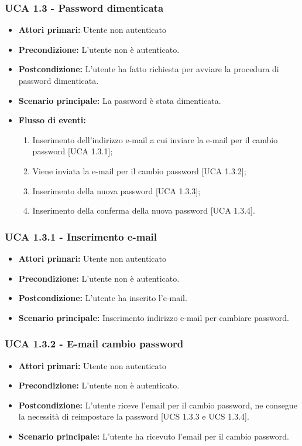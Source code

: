 \subsubsection{UCA 1.3 - Password dimenticata}%
\begin{itemize}
\item \textbf{Attori primari:} Utente non autenticato
\item \textbf{Precondizione:}  L'utente non è autenticato.
\item \textbf{Postcondizione:} L'utente ha fatto richiesta per avviare la procedura di password dimenticata.
\item \textbf{Scenario principale:} La password è stata dimenticata.
\item \textbf{Flusso di eventi:}
  \begin{enumerate}
        \item Inserimento dell'indirizzo e-mail a cui inviare la e-mail per il cambio password [UCA 1.3.1];
        \item Viene inviata la e-mail per il cambio password [UCA 1.3.2];
        \item Inserimento della nuova password [UCA 1.3.3];
        \item Inserimento della conferma della nuova password [UCA 1.3.4].
    \end{enumerate}
\end{itemize}

\subsubsection{UCA 1.3.1 - Inserimento e-mail}
\begin{itemize}
\item \textbf{Attori primari:} Utente non autenticato
\item \textbf{Precondizione:} L'utente non è autenticato.
\item \textbf{Postcondizione:} L'utente ha inserito l'e-mail.
\item \textbf{Scenario principale:} Inserimento indirizzo e-mail per cambiare password.
\end{itemize}

\subsubsection{UCA 1.3.2 - E-mail cambio password}
\begin{itemize}
\item \textbf{Attori primari:} Utente non autenticato
\item \textbf{Precondizione:} L'utente non è autenticato.
\item \textbf{Postcondizione:} L'utente riceve l'email per il cambio password, ne consegue la necessità di reimpostare la password [UCS 1.3.3 e UCS 1.3.4].
\item \textbf{Scenario principale:} L'utente ha ricevuto l'email per il cambio password.
\end{itemize}

